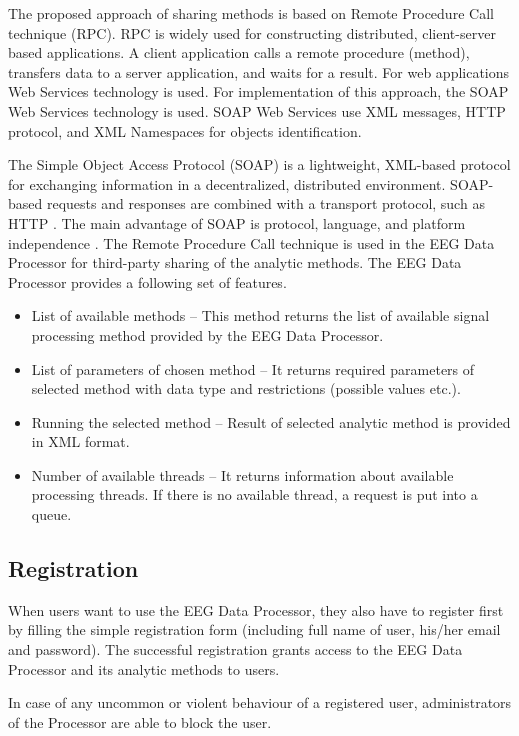 \documentclass{frontiersSCNS} %
\begin{document}
The proposed approach of sharing methods is based on Remote Procedure Call technique (RPC). RPC is widely used for constructing distributed, client-server based applications. A client application calls a remote procedure (method), transfers data to a server application, and waits for a result. For web applications Web Services technology \cite{Liu06} is used. For implementation of this approach, the SOAP Web Services technology is used. SOAP Web Services \cite{Liu06} use XML messages, HTTP protocol, and XML Namespaces for objects identification.

The Simple Object Access Protocol (SOAP) is a lightweight, XML-based protocol for exchanging information in a decentralized, distributed environment. SOAP-based requests and responses are combined with a transport protocol, such as HTTP \cite{WS}. The main advantage of SOAP is protocol, language, and platform independence \cite{WS}.
The Remote Procedure Call technique is used in the EEG Data Processor for third-party sharing of the analytic methods. The EEG Data Processor provides a following set of features.

\begin{itemize}
\item List of available methods – This method returns the list of available signal processing method provided by the EEG Data Processor.
\item List of parameters of chosen method – It returns required parameters of selected method with data type and restrictions (possible values etc.).
\item Running the selected method – Result of selected analytic method is provided in XML format.
\item Number of available threads – It returns information about available processing threads. If there is no available thread, a request is put into a queue.

\end{itemize}

\subsection{Registration}

When users want to use the EEG Data Processor, they also have to register first by filling the simple registration form (including full name of user, his/her email and password). The successful registration grants access to the EEG Data Processor and its analytic methods to users.

In case of any uncommon or violent behaviour of a registered user, administrators of the Processor are able to block the user.
\end{document}
